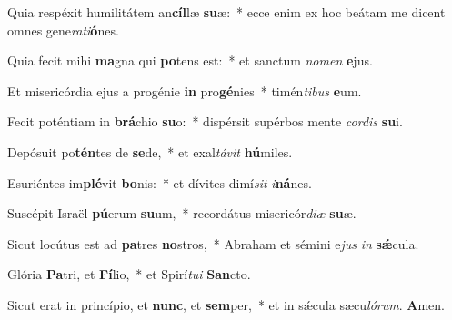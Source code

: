 ﻿\setcounter{enumi}{2}
\item Quia respéxit humilitátem an\textbf{cíl}læ \textbf{su}æ:~* ecce enim ex hoc beátam me dicent omnes gene\textit{ra}\textit{ti}\textbf{ó}nes.

\item Quia fecit mihi \textbf{ma}gna qui \textbf{po}tens est:~* et sanctum \textit{no}\textit{men} \textbf{e}jus.

\item Et misericórdia ejus a progénie \textbf{in} pro\textbf{gé}nies~* timén\textit{ti}\textit{bus} \textbf{e}um.

\item Fecit poténtiam in \textbf{brá}chio \textbf{su}o:~* dispérsit supérbos mente \textit{cor}\textit{dis} \textbf{su}i.

\item Depósuit po\textbf{tén}tes de \textbf{se}de,~* et exal\textit{tá}\textit{vit} \textbf{hú}miles.

\item Esuriéntes im\textbf{plé}vit \textbf{bo}nis:~* et dívites dimí\textit{sit} \textit{i}\textbf{ná}nes.

\item Suscépit Israël \textbf{pú}erum \textbf{su}um,~* recordátus misericór\textit{di}\textit{æ} \textbf{su}æ.

\item Sicut locútus est ad \textbf{pa}tres \textbf{no}stros,~* Abraham et sémini e\textit{jus} \textit{in} \textbf{sǽ}cula.

\item Glória \textbf{Pa}tri, et \textbf{Fí}lio,~* et Spirí\textit{tu}\textit{i} \textbf{San}cto.

\item Sicut erat in princípio, et \textbf{nunc}, et \textbf{sem}per,~* et in sǽcula sæcu\textit{ló}\textit{rum}. \textbf{A}men.